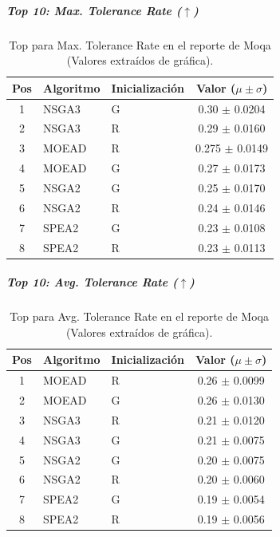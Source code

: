 \documentclass[a4paper,10pt]{article}
\begin{document}
\subparagraph{Top 10: Max. Tolerance Rate ($\uparrow$)}
\begin{table}[H]
    \centering
    \begin{tabular}{cllc}
        \toprule
        Pos & Algoritmo & Inicialización & Valor ($\mu \pm \sigma$) \\
        \midrule
        1 & NSGA3 & G & 0.30 $\pm$ 0.0204 \\
        2 & NSGA3 & R & 0.29 $\pm$ 0.0160 \\
        3 & MOEAD & R & 0.275 $\pm$ 0.0149 \\
        4 & MOEAD & G & 0.27 $\pm$ 0.0173 \\
        5 & NSGA2 & G & 0.25 $\pm$ 0.0170 \\
        6 & NSGA2 & R & 0.24 $\pm$ 0.0146 \\
        7 & SPEA2 & G & 0.23 $\pm$ 0.0108 \\
        8 & SPEA2 & R & 0.23 $\pm$ 0.0113 \\
        \bottomrule
    \end{tabular}
    \caption{Top para Max. Tolerance Rate en el reporte de Moqa (Valores extraídos de gráfica).}
\end{table}

\subparagraph{Top 10: Avg. Tolerance Rate ($\uparrow$)}
\begin{table}[H]
    \centering
    \begin{tabular}{cllc}
        \toprule
        Pos & Algoritmo & Inicialización & Valor ($\mu \pm \sigma$) \\
        \midrule
        1 & MOEAD & R & 0.26 $\pm$ 0.0099 \\
        2 & MOEAD & G & 0.26 $\pm$ 0.0130 \\
        3 & NSGA3 & R & 0.21 $\pm$ 0.0120 \\
        4 & NSGA3 & G & 0.21 $\pm$ 0.0075 \\
        5 & NSGA2 & G & 0.20 $\pm$ 0.0075 \\
        6 & NSGA2 & R & 0.20 $\pm$ 0.0060 \\
        7 & SPEA2 & G & 0.19 $\pm$ 0.0054 \\
        8 & SPEA2 & R & 0.19 $\pm$ 0.0056 \\
        \bottomrule
    \end{tabular}
    \caption{Top para Avg. Tolerance Rate en el reporte de Moqa (Valores extraídos de gráfica).}
\end{table}
\end{document}
